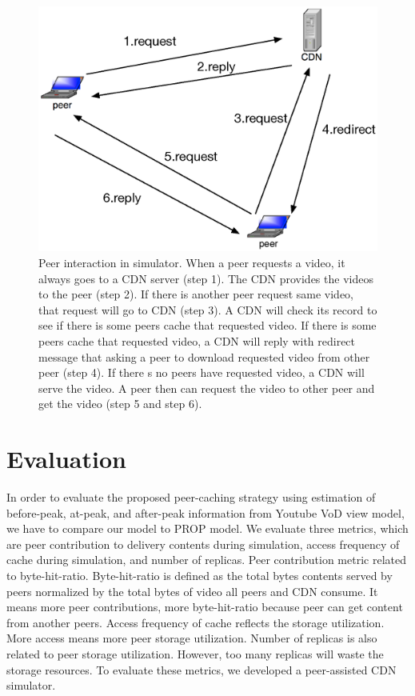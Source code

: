 \documentclass[10pt,final,journal,a4paper]{IEEEtran}
\begin{document}
\begin{figure}[!t]
\begin{center}
\includegraphics[scale=0.4]{graphs/p2p-system-description.eps}
\end{center}
\caption{Peer interaction in simulator.
When a peer requests a video, it always goes to a CDN server (step 1). 
The CDN provides the videos to the peer (step 2). 
If there is another peer request same video, that request will go to CDN (step 3).  
A CDN will check its record to see if there is some peers cache that requested video.  
If there is some peers cache that requested video, a CDN will reply with redirect message that asking a peer to download requested video from other peer (step 4).
If there s no peers have requested video, a CDN will serve the video.   
A peer then can request the video to other peer and get the video (step 5 and step 6).
}
\label{fig:p2pcdninteractioninsimulator}
\end{figure} 



\section{Evaluation}\label{evaluation}

In order to evaluate the proposed peer-caching strategy using estimation of before-peak, at-peak, and after-peak information from Youtube VoD view model, we have to compare our model to PROP model.
We evaluate three metrics, which are peer contribution to delivery contents during simulation,  access frequency of cache during simulation, and number of replicas. 
Peer contribution metric related to byte-hit-ratio. 
Byte-hit-ratio is defined as the total bytes contents served by peers normalized by the total bytes of video all peers and CDN consume.
It means more peer contributions, more byte-hit-ratio because peer can get content from another peers. 
Access frequency of cache reflects the storage utilization. 
More access means more peer storage utilization.  
Number of replicas is also related to peer storage utilization.  
However, too many replicas will waste the storage resources.
To evaluate these metrics, we developed a peer-assisted CDN simulator. 
\end{document}
